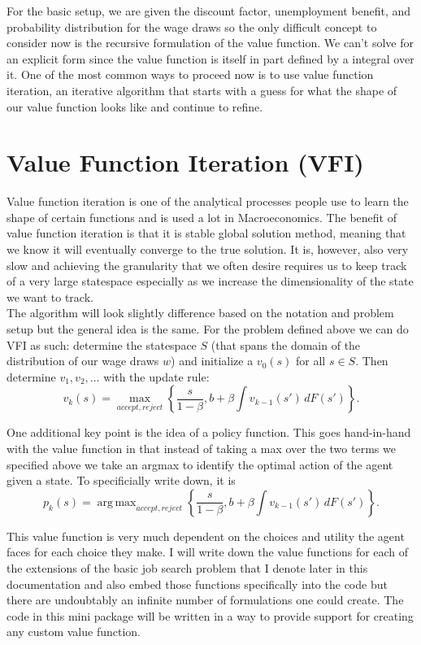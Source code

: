 \documentclass[11pt,english]{article}
\DeclareMathOperator*{\argmax}{arg\,max}
\begin{document}
\noindent For the basic setup, we are given the discount factor, unemployment benefit, and probability distribution for the wage draws so the only difficult concept to consider now is the recursive formulation of the value function. We can't solve for an explicit form since the value function is itself in part defined by a integral over it. One of the most common ways to proceed now is to use value function iteration, an iterative algorithm that starts with a guess for what the shape of our value function looks like and continue to refine.

\section{Value Function Iteration (VFI)}

Value function iteration is one of the analytical processes people use to learn the shape of certain functions and is used a lot in Macroeconomics. The benefit of value function iteration is that it is stable global solution method, meaning that we know it will eventually converge to the true solution. It is, however, also very slow and achieving the granularity that we often desire requires us to keep track of a very large statespace especially as we increase the dimensionality of the state we want to track.\\

\noindent The algorithm will look slightly difference based on the notation and problem setup but the general idea is the same. For the problem defined above we can do VFI as such: determine the statespace $S$ (that spans the domain of the distribution of our wage draws $w$) and initialize a $v_0(s)$ for all $s\in S$. Then determine $v_1, v_2, \ldots$ with the update rule: $$v_k(s) = \max_{accept, reject}\left\{\frac{s}{1-\beta},b + \beta\int v_{k-1}(s')\,dF(s')\right\}.$$

\noindent One additional key point is the idea of a policy function. This goes hand-in-hand with the value function in that instead of taking a max over the two terms we specified above we take an argmax to identify the optimal action of the agent given a state. To specificially write down, it is $$p_k(s) = \argmax_{accept, reject}\left\{\frac{s}{1-\beta},b + \beta\int v_{k-1}(s')\,dF(s')\right\}.$$

\noindent This value function is very much dependent on the choices and utility the agent faces for each choice they make. I will write down the value functions for each of the extensions of the basic job search problem that I denote later in this documentation and also embed those functions specifically into the code but there are undoubtably an infinite number of formulations one could create. The code in this mini package will be written in a way to provide support for creating any custom value function.
\end{document}
